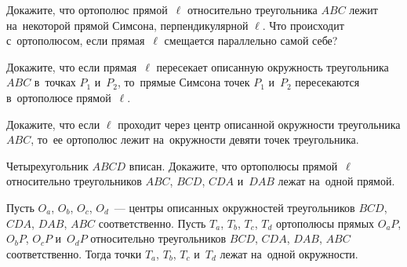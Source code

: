 \begin{problems}
\item
Докажите, что ортополюс прямой~$\ell$ относительно треугольника $ABC$ лежит
на~некоторой прямой Симсона, перпендикулярной $\ell$.
Что происходит с~ортополюсом, если прямая~$\ell$ смещается параллельно самой
себе?

\item
Докажите, что если прямая~$\ell$ пересекает описанную окружность
треугольника $ABC$ в~точках $P_1$ и~$P_2$, то~прямые Симсона точек $P_1$
и~$P_2$ пересекаются в~ортополюсе прямой~$\ell$.

\item
Докажите, что если $\ell$ проходит через центр описанной окружности
треугольника $ABC$, то~ее ортополюс лежит на~окружности девяти точек
треугольника.

\item
Четырехугольник $ABCD$ вписан.
Докажите, что ортополюсы прямой~$\ell$ относительно треугольников
$ABC$, $BCD$, $CDA$ и~$DAB$ лежат на~одной прямой.

\item
Пусть $O_{a}$, $O_{b}$, $O_{c}$, $O_{d}$~--- центры описанных окружностей
треугольников $BCD$, $CDA$, $DAB$, $ABC$ соответственно.
Пусть $T_{a}$, $T_{b}$, $T_{c}$, $T_{d}$ ортополюсы прямых
$O_{a} P$, $O_{b} P$, $O_{c} P$ и~$O_{d} P$ относительно треугольников
$BCD$, $CDA$, $DAB$, $ABC$ соответственно.
Тогда точки $T_{a}$, $T_{b}$, $T_{c}$ и~$T_{d}$ лежат на~одной окружности.

\end{problems}

